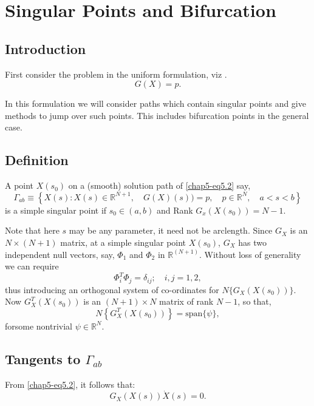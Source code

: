 \chapter{Singular Points and Bifurcation}\label{chap5}%

\section{Introduction}\pageoriginale\label{chap5-sec5.1}%
 
 First consider the problem in the uniform formulation, viz . 
\begin{equation*}
G(X) =p. \tag{5.2}\label{chap5-eq5.2}
\end{equation*} 
 
 In this formulation we will consider paths which contain singular
 points and give methods to jump over such points. This includes
 bifurcation points in  the general case. 
 
\setcounter{section}{2}
\section{Definition}\label{chap5-eq5.3}

A point $X(s_0)$ on a (smooth) solution path of \eqref{chap5-eq5.2} say, 
$$
\Gamma_{ab} \equiv \left\{ X(s) : X(s) \in  \mathbb{R}^{N+1}, \quad 
G(X)(s))=p, \quad p \in  \mathbb{R}^N, \quad a< s < b \right\}
$$
is a simple singular point if $ s_0 \in  (a,b)$ and Rank
$G_x(X(s_0)) =N-1$.  

Note that here $s$ may be any parameter, it need not be
 arclength. Since $G_X$ is an $N\times (N+1)$ matrix, at a simple
 singular point $X(s_0)$, $G_X$ has two independent null vectors, say,
 $\Phi_1 $ and  $\Phi_2$ in $\mathbb{R}^{(N+1)}$. Without loss of
 generality we can  require  
  $$
 \Phi^T_i \Phi _j= \delta_{ij}; \quad i,j = 1,2,
 $$
 thus introducing an orthogonal system of co-ordinates for $ N\{
 G_X(X(s_0))\}$. Now $G_X^T (X(s_0))$ is an $(N+1) \times N$ matrix of
 rank $N-1$, so that, 
 $$
 N \left\{ G_X^T(X(s_0)) \right\}= \text{span} \{ \psi \},
 $$
 for\pageoriginale some nontrivial $ \psi \in  \mathbb{R}^N$. 
 


\section*{Tangents to $\Gamma_{ab}$}
 
From \eqref{chap5-eq5.2}, it follows that:
$$
G_X(X(s)) \dot{X}(s)=0. 
$$

